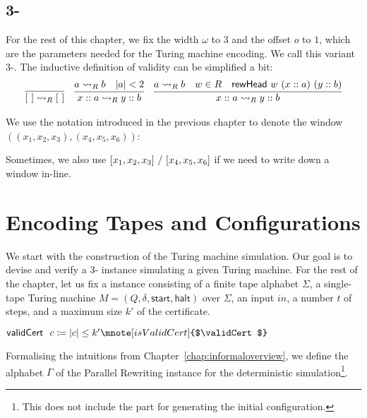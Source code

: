 \subsection{3-\PR{}}\label{sec:3pr}
For the rest of this chapter, we fix the width $\omega$ to $3$ and the offset $o$ to $1$, which are the parameters needed for the Turing machine encoding. We call this variant 3-\PR{}. 
The inductive definition of validity can be simplified a bit:
\begin{align*}
  \infer{\nil \strent{R} \nil}{} \quad
  \infer{x::a \strent{R} y ::b}{a \strent{R} b \quad \length{a} < 2} \quad
  \infer{x::a \strent{R} y :: b}{a \strent{R} b \quad w \in R \quad \rewHead{w}{(x::a)}{(y::b)}}
\end{align*}

We use the notation introduced in the previous chapter to denote the window $((x_1, x_2, x_3), (x_4, x_5, x_6))$: 
\begin{center}
\end{center}
Sometimes, we also use $[x_1, x_2, x_3]~/~[x_4, x_5, x_6]$ if we need to write down a window in-line.

\section{Encoding Tapes and Configurations}
We start with the construction of the Turing machine simulation. Our goal is to devise and verify a 3-\PR{} instance simulating a given Turing machine. 
For the rest of the chapter, let us fix a \gennp{} instance consisting of a finite tape alphabet $\Sigma$, a single-tape Turing machine $M = (Q, \delta, \textsf{start}, \textsf{halt})$ over $\Sigma$, an input $in$, a number $t$ of steps, and a maximum size $k'$ of the certificate. 

\begin{definition}
  $\validCert~c \defeq \length{c} \le k' \mnote[isValidCert]{$\validCert$}$
\end{definition}

Formalising the intuitions from Chapter~\ref{chap:informaloverview}, we define the alphabet $\Gamma$ of the Parallel Rewriting instance for the deterministic simulation\footnote{This does not include the part for generating the initial configuration.}.

